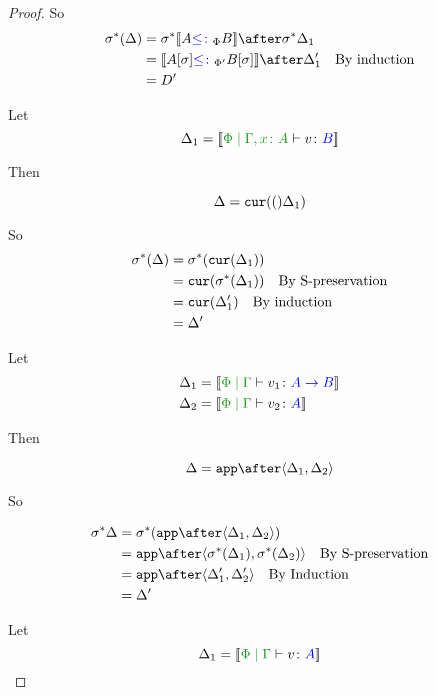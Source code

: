 \documentclass{report}
\begin{document}
\begin{framed}
\begin{proof}
    So 
    \begin{align*}
        \si\star(\D) & = \si\star{\deno{A\subtypep B}}\after\si\star\D_1 \\
        & = \deno{A\ssi\subtypepp B\ssi}\after\D_1'\qt{By induction}\\
        & = D'
    \end{align*}
    
    \case{\vfun}
    Let \begin{equation}
        \D_1 = \deno{\etyperelation{\P}{\gax}{v}{B}}
    \end{equation}
    
    Then
    
    \begin{equation}
        \Delta = \texttt{cur}(()\Delta_1)\\
    \end{equation}
    
    So
    \begin{align*}
        \sigma^*(\Delta) & = \sigma^*(\texttt{cur}(\Delta_1))\\
        & = \texttt{cur}(\sigma^*(\Delta_1))\quad\text{By S-preservation}\\
        & = \texttt{cur}(\Delta_1')\quad\text{By induction}\\
        & = \Delta'
    \end{align*}
    
    \case{\vapply}
    Let \begin{align*}
        \D_1 &= \deno{\gpetyperelation{v_1}{\ab}}\\
        \D_2 &= \deno{\gpetyperelation{v_2}{A}}
    \end{align*}
    
    Then
    
    \begin{equation}
        \D = \app\after\pr{\D_1}{\D_2}\\
    \end{equation}
    
    So
    
    \begin{align*}
        \si\star\D & = \si\star(\app\after\pr{\D_1}{\D_2})\\
        & = \app\after\pr{\si\star(\D_1)}{\si\star(\D_2)}\qt{By S-preservation}\\
        & = \app\after\pr{\D_1'}{\D_2'}\qt{By Induction}\\
        & = \D'
    \end{align*}
    
    \case{\vreturn}
    Let \begin{equation}
        \D_1 = \deno{\gpetyperelation{v}{A}}
    \end{equation}
    

\end{proof}
\end{framed}
\end{document}
